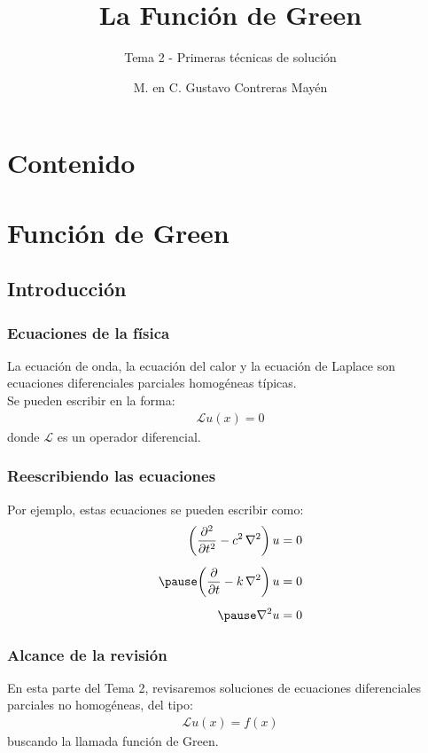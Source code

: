 \documentclass[12pt]{beamer}
\date{}
\title{\large{La Función de Green}}
\subtitle{Tema 2 - Primeras técnicas de solución}
\author{M. en C. Gustavo Contreras Mayén}
\begin{document}
\maketitle
\fontsize{14}{14}\selectfont
{}

\section*{Contenido}

\section{Función de Green}
\subsection{Introducción}

\begin{frame}
\frametitle{Ecuaciones de la física}
La ecuación de onda, la ecuación del calor y la ecuación de Laplace son ecuaciones diferenciales parciales homogéneas típicas.
\\
\bigskip
\pause
Se pueden escribir en la forma:
\pause
\begin{align*}
\mathcal{L} u (x) = 0
\end{align*}
donde $\mathcal{L}$ es un operador diferencial.
\end{frame}
\begin{frame}
\frametitle{Reescribiendo las ecuaciones}
Por ejemplo, estas ecuaciones se pueden escribir como:
\pause
\begin{eqnarray*}
\begin{aligned}
\bigg( \pdv[2]{t} - c^{2} \, \laplacian \bigg) \, u &= 0 \\[0.5em] \pause
\bigg( \pdv{t} - k \, \laplacian \bigg) \, u &= 0 \\[0.5em] \pause
\laplacian{u} &= 0
\end{aligned}
\end{eqnarray*}
\end{frame}

\begin{frame}
\frametitle{Alcance de la revisión}
En esta parte del Tema  2, revisaremos soluciones de ecuaciones diferenciales parciales no homogéneas, del tipo:
\pause
\begin{align*}
\mathcal{L} u (x) = f (x)
\end{align*}
buscando la llamada función de Green. 
\end{frame}
\end{document}
